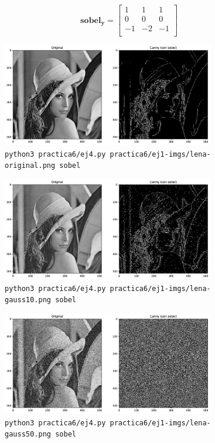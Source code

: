 \documentclass[11pt, spanish]{article}
\begin{document}
\[
\mathbf{sobel_y} = \begin{bmatrix} 
1 & 1 & 1 \\
0 & 0 & 0 \\
-1 & -2 & -1 \\
\end{bmatrix}
\]

\begin{figure}[H]
\centering
    \includegraphics[height=4.5cm]{informe-imgs/ej4-sobel-lena-original.jpg}
    \caption{\texttt{python3 practica6/ej4.py practica6/ej1-imgs/lena-original.png sobel}}
\end{figure}

\begin{figure}[H]
\centering
    \includegraphics[height=4.5cm]{informe-imgs/ej4-sobel-lena-gauss10.jpg}
    \caption{\texttt{python3 practica6/ej4.py practica6/ej1-imgs/lena-gauss10.png sobel}}
\end{figure}

\begin{figure}[H]
\centering
    \includegraphics[height=4.5cm]{informe-imgs/ej4-sobel-lena-gauss50.jpg}
    \caption{\texttt{python3 practica6/ej4.py practica6/ej1-imgs/lena-gauss50.png sobel}}
\end{figure}
\end{document}
